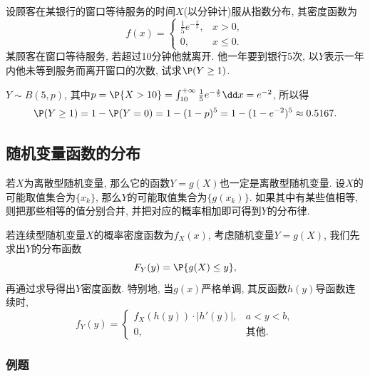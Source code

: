 \documentclass[11pt]{ctexart}
\begin{document}
\begin{example}
	设顾客在某银行的窗口等待服务的时间$X$(以分钟计)服从指数分布, 其密度函数为
	\begin{equation*}
		f(x) = 
			\begin{cases}
				\frac{1}{5} e^{-\frac{x}{5}}, & x > 0, \\
				0, & x \leq 0. 
			\end{cases}
	\end{equation*}
	某顾客在窗口等待服务, 若超过10分钟他就离开. 
	他一年要到银行5次, 以$Y$表示一年内他未等到服务而离开窗口的次数, 试求$\P(Y \geq 1)$. 
\end{example}
\begin{solution}
	$Y \sim B(5, p)$, 其中$p = \P\{X > 10\} = \int_{10}^{+\infty} \frac{1}{5} e^{-\frac{x}{5}} \dd x = e^{-2}$, 所以得
	\begin{equation*}
		\P(Y \geq 1)
		=1-\P(Y=0)
		=1-(1-p)^{5}
		=1-(1-e^{-2})^5
		\approx 0.516 7.
	\end{equation*}
\end{solution}

\subsection{随机变量函数的分布}


若$X$为离散型随机变量, 那么它的函数$Y = g(X)$也一定是离散型随机变量. 
设$X$的可能取值集合为$\{x_k\}$, 那么$Y$的可能取值集合为$\{g(x_k)\}$. 
如果其中有某些值相等, 则把那些相等的值分别合并, 并把对应的概率相加即可得到$Y$的分布律. 

若连续型随机变量$X$的概率密度函数为$f_X(x)$, 考虑随机变量$Y = g(X)$, 我们先求出$Y$的分布函数
\begin{equation*}
	F_Y(y) = \P\{g(X) \leq y\}, 
\end{equation*}
再通过求导得出$Y$密度函数. 
特别地, 当$g(x)$严格单调, 其反函数$h(y)$导函数连续时, 
\begin{equation}\label{eq:DensityofFun}
	f_Y(y) = 
	\begin{cases}
		f_X(h(y)) \cdot |h'(y)|, & a < y < b, \\
		0, &\text{其他}. 
	\end{cases}
\end{equation}

\subsubsection{例题}
\end{document}
